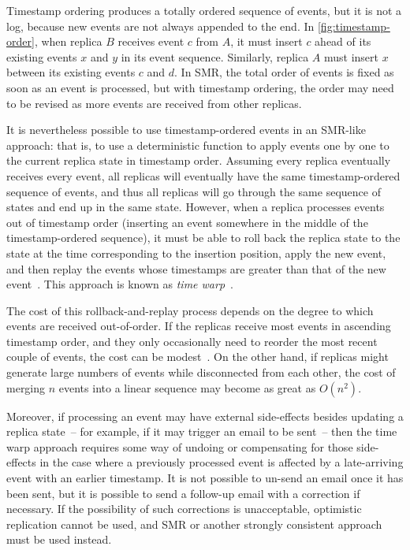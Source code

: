 \documentclass[sigconf]{acmart}
\begin{document}
Timestamp ordering produces a totally ordered sequence of events, but it is not a log, because new events are not always appended to the end.
In \autoref{fig:timestamp-order}, when replica $B$ receives event $c$ from $A$, it must insert $c$ ahead of its existing events $x$ and $y$ in its event sequence.
Similarly, replica $A$ must insert $x$ between its existing events $c$ and $d$.
In SMR, the total order of events is fixed as soon as an event is processed, but with timestamp ordering, the order may need to be revised as more events are received from other replicas.

It is nevertheless possible to use timestamp-ordered events in an SMR-like approach: that is, to use a deterministic function to apply events one by one to the current replica state in timestamp order.
Assuming every replica eventually receives every event, all replicas will eventually have the same timestamp-ordered sequence of events, and thus all replicas will go through the same sequence of states and end up in the same state.
However, when a replica processes events out of timestamp order (inserting an event somewhere in the middle of the timestamp-ordered sequence), it must be able to roll back the replica state to the state at the time corresponding to the insertion position, apply the new event, and then replay the events whose timestamps are greater than that of the new event~\cite{Terry:1995}.
This approach is known as \emph{time warp}~\cite{Jefferson:1985}.

The cost of this rollback-and-replay process depends on the degree to which events are received out-of-order.
If the replicas receive most events in ascending timestamp order, and they only occasionally need to reorder the most recent couple of events, the cost can be modest~\cite{Kuhn:2021}.
On the other hand, if replicas might generate large numbers of events while disconnected from each other, the cost of merging $n$ events into a linear sequence may become as great as $O(n^2)$.

Moreover, if processing an event may have external side-effects besides updating a replica state~-- for example, if it may trigger an email to be sent~-- then the time warp approach requires some way of undoing or compensating for those side-effects in the case where a previously processed event is affected by a late-arriving event with an earlier timestamp.
It is not possible to un-send an email once it has been sent, but it is possible to send a follow-up email with a correction if necessary.
If the possibility of such corrections is unacceptable, optimistic replication cannot be used, and SMR or another strongly consistent approach must be used instead.
\end{document}
